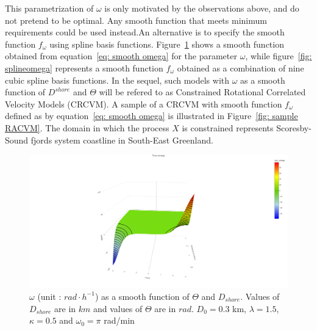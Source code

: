\documentclass[11pt]{article}
\newcommand {\1}{\mathbb{1}}
\begin{document}
This parametrization of $\omega$ is only motivated by the observations above, and do not pretend to be optimal. Any smooth function that meets minimum requirements could be used instead.An alternative is to specify the smooth function $f_{\omega}$ using spline basis functions. Figure~\ref{fig: trueomega} shows a smooth function obtained from equation~\ref{eq: smooth omega} for the parameter $\omega$, while figure~\ref{fig: splineomega} represents a smooth function $f_{\omega}$ obtained as a combination of nine cubic spline basis functions. In the sequel, such models with $\omega$ as a smooth function of $D^{shore}$ and $\Theta$ will be refered to as Constrained Rotational Correlated Velocity Models (CRCVM). A sample of a CRCVM with smooth function $f_{\omega}$ defined as by equation~\ref{eq: smooth omega} is illustrated in Figure~\ref{fig: sample RACVM}. The domain in which the process $X$ is constrained represents Scoresby-Sound fjords system coastline in South-East Greenland.


\begin{figure}[H]
	\centering
		\centering
		\includegraphics[scale=0.25]{images/simulation study/true_smooth_omega_rect.png}
		\caption{$\omega$ (unit : $rad \cdot h^{-1}$) as a smooth function of $\Theta$ and $D_{shore}$. Values of $D_{shore}$ are in $km$ and values of $\Theta$ are in $rad$.
		$D_0=0.3$ km, $\lambda=1.5$, $\kappa=0.5$ and $\omega_0=\pi$ rad/min}
		\label{fig: trueomega}
\end{figure}
\end{document}
